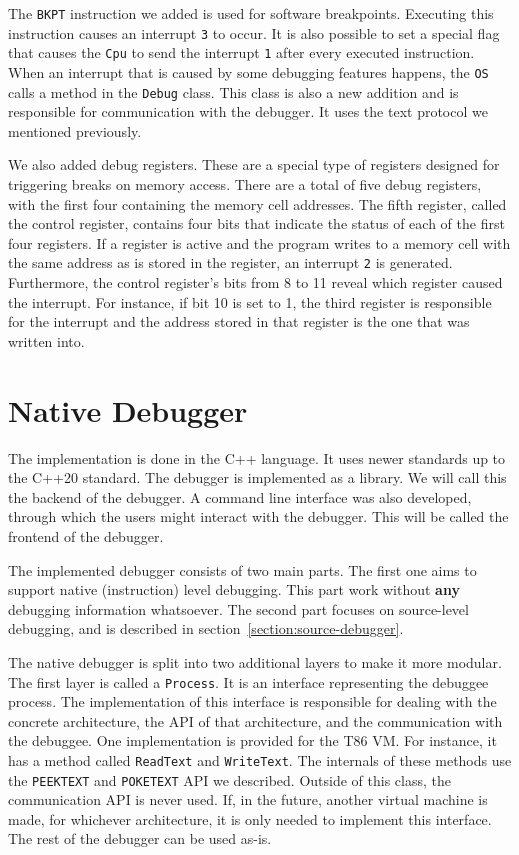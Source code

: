 The \texttt{BKPT} instruction we added is used for software breakpoints.
Executing this instruction causes an interrupt \texttt{3} to occur. It is also
possible to set a special flag that causes the \texttt{Cpu} to send the
interrupt \texttt{1} after every executed instruction. When an interrupt that
is caused by some debugging features happens, the \texttt{OS} calls a method
in the \texttt{Debug} class. This class is also a new addition and is
responsible for communication with the debugger. It uses the text protocol we
mentioned previously.

We also added debug registers. These are a special type of registers designed
for triggering breaks on memory access. There are a total of five debug
registers, with the first four containing the memory cell addresses. The fifth
register, called the control register, contains four bits that indicate the
status of each of the first four registers. If a register is active and the
program writes to a memory cell with the same address as is stored in the
register, an interrupt \texttt{2} is generated. Furthermore, the control
register's bits from 8 to 11 reveal which register caused the interrupt. For
instance, if bit 10 is set to 1, the third register is responsible for the
interrupt and the address stored in that register is the one that was written
into.

\section{Native Debugger}
The implementation is done in the C++ language. It uses newer standards up to
the C++20 standard. The debugger is implemented as a library. We will call this
the backend of the debugger. A command line interface was also developed,
through which the users might interact with the debugger. This will be called
the frontend of the debugger.

The implemented debugger consists of two main parts. The first one aims to
support native (instruction) level debugging. This part work without
\textbf{any} debugging information whatsoever. The second part focuses on
source-level debugging, and is described in
section~\ref{section:source-debugger}.

The native debugger is split into two additional layers to make it more
modular. The first layer is called a \texttt{Process}. It is an interface
representing the debuggee process. The implementation of this interface is
responsible for dealing with the concrete architecture, the API of that
architecture, and the communication with the debuggee. One implementation is
provided for the T86 VM. For instance, it has a method called \texttt{ReadText}
and \texttt{WriteText}. The internals of these methods use the
\texttt{PEEKTEXT} and \texttt{POKETEXT} API we described. Outside of this
class, the communication API is never used. If, in the future, another virtual
machine is made, for whichever architecture, it is only needed to implement
this interface. The rest of the debugger can be used as-is.

